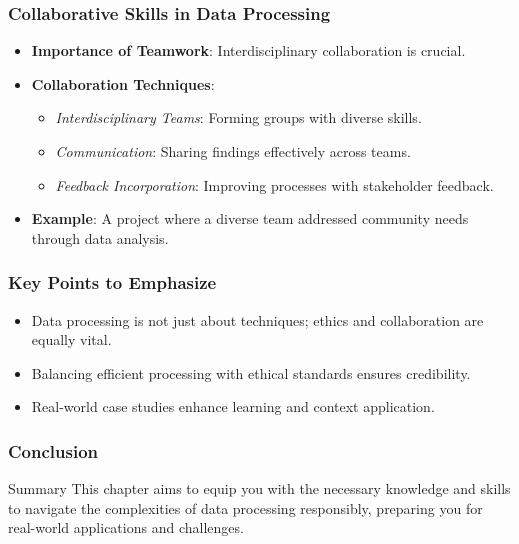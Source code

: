 \documentclass[aspectratio=169]{beamer}
\begin{document}
\begin{frame}[fragile]
    \frametitle{Collaborative Skills in Data Processing}
    \begin{itemize}
        \item \textbf{Importance of Teamwork}: Interdisciplinary collaboration is crucial.
        \item \textbf{Collaboration Techniques}:
            \begin{itemize}
                \item \textit{Interdisciplinary Teams}: Forming groups with diverse skills.
                \item \textit{Communication}: Sharing findings effectively across teams.
                \item \textit{Feedback Incorporation}: Improving processes with stakeholder feedback.
            \end{itemize}
        \item \textbf{Example}: A project where a diverse team addressed community needs through data analysis.
    \end{itemize}
\end{frame}

\begin{frame}[fragile]
    \frametitle{Key Points to Emphasize}
    \begin{itemize}
        \item Data processing is not just about techniques; ethics and collaboration are equally vital.
        \item Balancing efficient processing with ethical standards ensures credibility.
        \item Real-world case studies enhance learning and context application.
    \end{itemize}
\end{frame}

\begin{frame}[fragile]
    \frametitle{Conclusion}
    \begin{block}{Summary}
        This chapter aims to equip you with the necessary knowledge and skills to navigate the complexities of data processing responsibly, preparing you for real-world applications and challenges.
    \end{block}
\end{frame}
\end{document}
